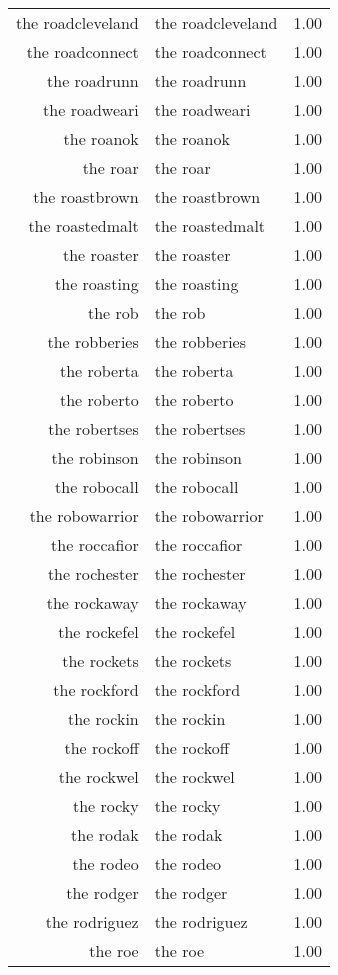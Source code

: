 \begin{table}[ht]
\begin{tabular}{rlr}
  the roadcleveland & the roadcleveland & 1.00 \\ 
  the roadconnect & the roadconnect & 1.00 \\ 
  the roadrunn & the roadrunn & 1.00 \\ 
  the roadweari & the roadweari & 1.00 \\ 
  the roanok & the roanok & 1.00 \\ 
  the roar & the roar & 1.00 \\ 
  the roastbrown & the roastbrown & 1.00 \\ 
  the roastedmalt & the roastedmalt & 1.00 \\ 
  the roaster & the roaster & 1.00 \\ 
  the roasting & the roasting & 1.00 \\ 
  the rob & the rob & 1.00 \\ 
  the robberies & the robberies & 1.00 \\ 
  the roberta & the roberta & 1.00 \\ 
  the roberto & the roberto & 1.00 \\ 
  the robertses & the robertses & 1.00 \\ 
  the robinson & the robinson & 1.00 \\ 
  the robocall & the robocall & 1.00 \\ 
  the robowarrior & the robowarrior & 1.00 \\ 
  the roccafior & the roccafior & 1.00 \\ 
  the rochester & the rochester & 1.00 \\ 
  the rockaway & the rockaway & 1.00 \\ 
  the rockefel & the rockefel & 1.00 \\ 
  the rockets & the rockets & 1.00 \\ 
  the rockford & the rockford & 1.00 \\ 
  the rockin & the rockin & 1.00 \\ 
  the rockoff & the rockoff & 1.00 \\ 
  the rockwel & the rockwel & 1.00 \\ 
  the rocky & the rocky & 1.00 \\ 
  the rodak & the rodak & 1.00 \\ 
  the rodeo & the rodeo & 1.00 \\ 
  the rodger & the rodger & 1.00 \\ 
  the rodriguez & the rodriguez & 1.00 \\ 
  the roe & the roe & 1.00 \\ 

\end{tabular}
\end{table}
